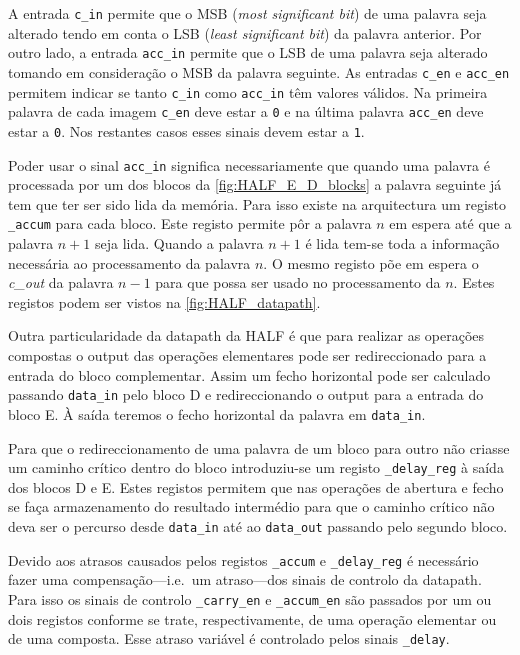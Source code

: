 \documentclass[a4paper]{article}
\begin{document}
A entrada \texttt{c\_in} permite que o MSB (\textit{most significant bit}) de uma palavra seja alterado tendo em conta o LSB (\textit{least significant bit}) da palavra anterior. Por outro lado, a entrada \texttt{acc\_in} permite que o LSB de uma palavra seja alterado tomando em consideração o MSB da palavra seguinte. As entradas \texttt{c\_en} e \texttt{acc\_en} permitem indicar se tanto \texttt{c\_in} como \texttt{acc\_in} têm valores válidos. Na primeira palavra de cada imagem \texttt{c\_en} deve estar a \texttt{0} e na última palavra \texttt{acc\_en} deve estar a \texttt{0}. Nos restantes casos esses sinais devem estar a \texttt{1}.

Poder usar o sinal \texttt{acc\_in} significa necessariamente que quando uma palavra é processada por um dos blocos da \autoref{fig:HALF_E_D_blocks} a palavra seguinte já tem que ter ser sido lida da memória. Para isso existe na arquitectura um registo \texttt{\_accum} para cada bloco. Este registo permite pôr a palavra $n$ em espera até que a palavra $n+1$ seja lida. Quando a palavra $n+1$ é lida tem-se toda a informação necessária ao processamento da palavra $n$. O mesmo registo põe em espera o \textit{c\_out} da palavra $n-1$ para que possa ser usado no processamento da $n$. Estes registos podem ser vistos na \autoref{fig:HALF_datapath}.

Outra particularidade da datapath da HALF é que para realizar as operações compostas o output das operações elementares pode ser redireccionado para a entrada do bloco complementar. Assim um fecho horizontal pode ser calculado passando \texttt{data\_in} pelo bloco D e redireccionando o output para a entrada do bloco E. À saída teremos o fecho horizontal da palavra em \texttt{data\_in}.

Para que o redireccionamento de uma palavra de um bloco para outro não criasse um caminho crítico dentro do bloco introduziu-se um registo \texttt{\_delay\_reg} à saída dos blocos D e E. Estes registos permitem que nas operações de abertura e fecho se faça armazenamento do resultado intermédio para que o caminho crítico não deva ser o percurso desde \texttt{data\_in} até ao \texttt{data\_out} passando pelo segundo bloco.

Devido aos atrasos causados pelos registos \texttt{\_accum} e \texttt{\_delay\_reg} é necessário fazer uma compensação---i.e.\ um atraso---dos sinais de controlo da datapath. Para isso os sinais de controlo \texttt{\_carry\_en} e \texttt{\_accum\_en} são passados por um ou dois registos conforme se trate, respectivamente, de uma operação elementar ou de uma composta. Esse atraso variável é controlado pelos sinais \texttt{\_delay}.
\end{document}
